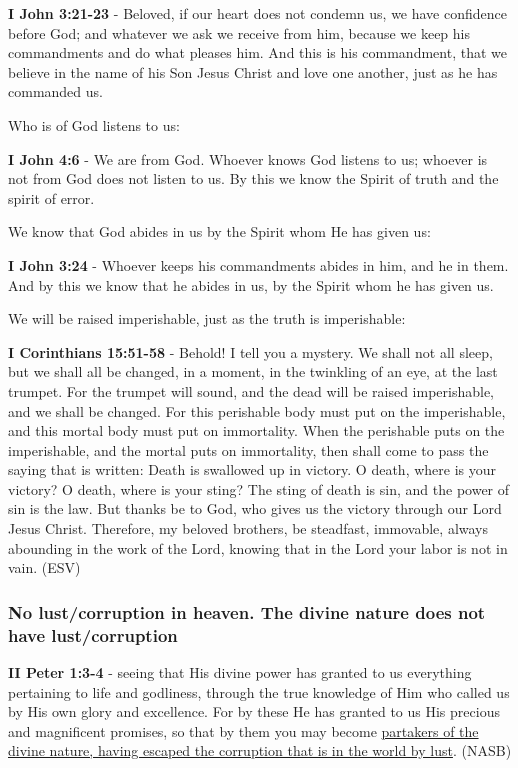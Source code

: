 \documentclass[11pt]{article}
\begin{document}
\textbf{I John 3:21-23} - Beloved, if our heart does not condemn us, we have confidence before God;
and whatever we ask we receive from him, because we keep his commandments and do what pleases him. And this is his commandment, that we believe in the name of his Son Jesus Christ and love one another, just as he has commanded us.

Who is of God listens to us:

\textbf{I John 4:6} - We are from God. Whoever knows God listens to us; whoever is not from God does not listen to us. By this we know the Spirit of truth and the spirit of error.

We know that God abides in us by the Spirit whom He has given us:

\textbf{I John 3:24} - Whoever keeps his commandments abides in him, and he in them. And by this we know that he abides in us, by the Spirit whom he has given us.

We will be raised imperishable, just as the truth is imperishable:

\textbf{I Corinthians 15:51-58} - Behold! I tell you a mystery. We shall not all sleep, but we shall all be changed, in a moment, in the twinkling of an eye, at the last trumpet. For the trumpet will sound, and the dead will be raised imperishable, and we shall be changed. For this perishable body must put on the imperishable, and this mortal body must put on immortality. When the perishable puts on the imperishable, and the mortal puts on immortality, then shall come to pass the saying that is written: Death is swallowed up in victory. O death, where is your victory? O death, where is your sting? The sting of death is sin, and the power of sin is the law. But thanks be to God, who gives us the victory through our Lord Jesus Christ. Therefore, my beloved brothers, be steadfast, immovable, always abounding in the work of the Lord, knowing that in the Lord your labor is not in vain. (ESV)

\subsubsection{No lust/corruption in heaven. The divine nature does not have lust/corruption}
\label{sec:org91c8088}
\textbf{II Peter 1:3-4} - seeing that His divine power has granted to us everything pertaining to life and godliness, through the true knowledge of Him who called us by His own glory and excellence. For by these He has granted to us His precious and magnificent promises, so that by them you may become \uline{partakers of the divine nature, having escaped the corruption that is in the world by lust}. (NASB)
\end{document}
